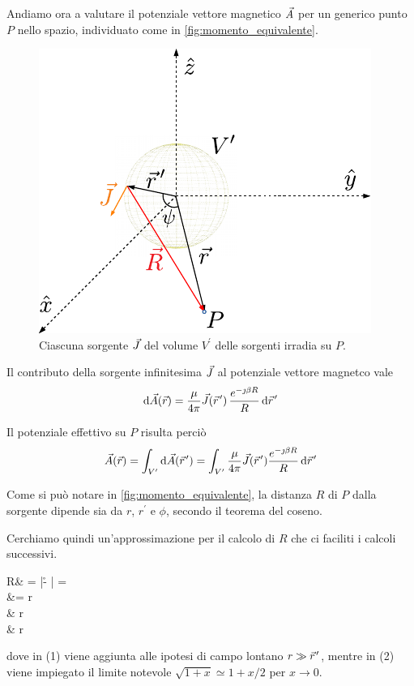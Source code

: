 Andiamo ora a valutare il potenziale vettore magnetico $\vec{A}$ per un generico punto $P$ nello spazio, individuato come in \autoref{fig:momento_equivalente}.

\begin{figure}[htp]
	\centering
	\includegraphics[]{img/momento_equivalente.pdf}
	\caption{Ciascuna sorgente $\vec{J}$ del volume $V^\prime$ delle sorgenti irradia su $P$.}
	\label{fig:momento_equivalente}
\end{figure}

Il contributo della sorgente infinitesima $\vec{J}$ al potenziale vettore magnetco vale
\begin{equation}
	\de \A(\r)
	= \frac{\mu}{4\pi} \J(\rp) \, \frac{e^{-\jmath \beta R}}{R} \de \rp
\end{equation}

Il potenziale effettivo su $P$ risulta perciò
\begin{equation} \label{eq:A_di_P}
	\A(\r)=\int_{V^\prime} \de \A(\rp) =\int_{V^\prime} \frac{\mu}{4\pi} \J(\rp) \frac{e^{-\jmath \beta R}}{R} \de \rp
\end{equation}

Come si può notare in \autoref{fig:momento_equivalente}, la distanza $R$ di $P$ dalla sorgente dipende sia da $r$, $r^\prime$ e $\phi$, secondo il teorema del coseno.

Cerchiamo quindi un'approssimazione per il calcolo di $R$ che ci faciliti i calcoli successivi.

\begin{esp} \label{eq:approssimazione_per_R}
	R&
	= |\r - \rp|
	=  \\
	&= r \,  \\
	& r \,  \\
	& r 
\end{esp}
dove in (1) viene aggiunta alle ipotesi di campo lontano $r \gg \rp$, mentre in (2) viene impiegato il limite notevole $\sqrt{1 + x} \simeq 1 + x/2$ per $x \to 0$.

